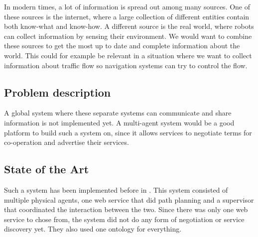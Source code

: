 In modern times, a lot of information is spread out among many sources. One
of these sources is the internet, where a large collection of different
entities contain both know-what and know-how.  A different source is the
real world, where robots can collect information by sensing their
environment. We would want to combine these sources to get the most up to
date and complete information about the world. This could for example be
relevant in a situation where we want to collect information about traffic
flow so navigation systems can try to control the flow.

\subsection{Problem description} 

A global system where these separate systems can communicate and share information
is not implemented yet. A multi-agent system would be a good platform to
build such a system on, since it allows services to negotiate terms for
co-operation and advertise their services. 


\subsection{State of the Art} 

Such a system has been implemented before in \cite{intframe}. This system
consisted of multiple physical agents, one web service that did path
planning and a supervisor that coordinated the interaction between the two.
Since there was only one web service to chose from, the system did not do
any form of negotiation or service discovery yet. They also used one
ontology for everything.

